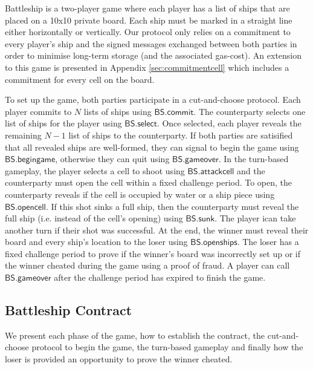 \documentclass{llncs}
\newcommand{\battleshipattackcell}{\mathsf{BS.attackcell}}
\newcommand{\battleshipbegin}{\mathsf{BS.begingame}}
\newcommand{\battleshipcommit}{\mathsf{BS.commit}}
\newcommand{\battleshipselectboard}{\mathsf{BS.select}}
\newcommand{\battleshiprevealcell}{\mathsf{BS.opencell}}
\newcommand{\battleshipsinking}{\mathsf{BS.sunk}}
\newcommand{\battleshiprevealboard}{\mathsf{BS.openships}}
\newcommand{\battleshipgameover}{\mathsf{BS.gameover}}
\begin{document}
Battleship is a two-player game where each player has a list of ships that are placed on a 10x10 private board. 
Each ship must be marked in a straight line either horizontally or vertically.
Our protocol only relies on a commitment to every player's ship and the signed messages exchanged between both parties in order to minimise long-term storage (and the associated gas-cost).
An extension to this game is presented in Appendix \ref{sec:commitmentcell} which includes a commitment for every cell on the board. 


To set up the game, both parties participate in a cut-and-choose protocol.
Each player commits to $N$ lists of ships using $\battleshipcommit$. 
The counterparty selects one list of ships for the player using $\battleshipselectboard$.
Once selected, each player reveals the remaining $N-1$ list of ships to the counterparty. 
If both parties are satisified that all revealed ships are well-formed, they can signal to begin the game using $\battleshipbegin$, otherwise they can quit using $\battleshipgameover$. 
In the turn-based gameplay, the player selects a cell to shoot using $\battleshipattackcell$ and the counterparty must open the cell  within a fixed challenge period. 
To open, the counterparty reveals if the cell is occupied by water or a ship piece using $\battleshiprevealcell$.
If this shot sinks a full ship, then the counterparty must reveal the full ship (i.e. instead of the cell's opening) using $\battleshipsinking$. 
The player ican take another turn if their shot was successful.
At the end, the winner must reveal their board and every ship's location to the loser using $\battleshiprevealboard$.
The loser has a fixed challenge period to prove if the winner's board was incorrectly set up or if the winner cheated during the game using a proof of fraud. 
A player can call $\battleshipgameover$ after the challenge period has expired to finish the game. 

\subsection{Battleship Contract}\label{sec:battleshipcontract}

We present each phase of the game, how to establish the contract, the cut-and-choose protocol to begin the game, the turn-based gameplay and finally how the loser is provided an opportunity to prove the winner cheated.
\end{document}
